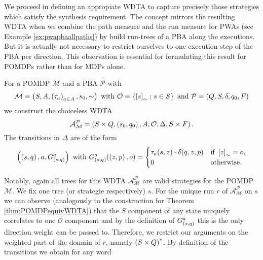 We proceed in defining an appropiate \ac{WDTA} to capture precisely those 
strategies which satisfy the synthesis requirement. The concept mirrors the
resulting \ac{WDTA} when we combine the path measure and the run measure for
\acp{PWA} (see Example \ref{ex:pwapbaallpaths}) by build run-trees of a 
\ac{PBA} along the executions. But it is actually not necessary to restrict
ourselves to one execution step of the \ac{PBA} per direction. This 
observation is essential for formulating this result for \acp{POMDP} rather 
than for \acp{MDP} alone.
\begin{definition}
  For a \ac{POMDP} $\mathcal{M}$ and a \ac{PBA} $\mathcal{P}$ with
  \begin{equation*}
    \mathcal{M} = \left(S, A, \left(\tau_{a}\right)_{a\in A}, s_{0}, \sim\right)
    \text{ with }
    \mathcal{O} = \left\{\left[s\right]_{\sim}: s\in S\right\}
    \text{ and }
    \mathcal{P} = \left(Q, S, \delta, q_{0}, F\right)
  \end{equation*} 
  we construct the choiceless \ac{WDTA}
  \begin{equation*}
    \mathcal{A}_{\mathcal{M}}^{\mathcal{P}} = \left(
      S\times Q, \left(s_{0}, q_{0}\right), A, \mathcal{O}, \Delta, S\times F
    \right).
  \end{equation*}
  The transitions in $\Delta$ are of the form
  \begin{equation*}
    \left(\left(s, q\right), a, G_{\left(s,q\right)}^{a}\right)
    \text{ with }
    G_{\left(s,q\right)}^{a}(\left(z,p\right), o) = \begin{cases}
      \tau_{a}(s, z)\cdot\delta(q, z, p)&\text{if }\left[z\right]_{\sim} = o,\\
      0&\text{otherwise}.
    \end{cases}
  \end{equation*}
\end{definition}
Notably, again all trees for this \ac{WDTA} 
$\mathcal{A}_{\mathcal{M}}^{\mathcal{P}}$ are valid strategies for the 
\ac{POMDP} $\mathcal{M}$. We fix one tree (or strategie respectively) $s$. 
For the unique run $r$ of $\mathcal{A}_{\mathcal{M}}^{\mathcal{P}}$ on $s$ we
can observe (analogously to the construction for Theorem 
\ref{thm:POMDPequivWDTA}) that the $S$ component of any state uniquely 
correlates to one $\mathcal{O}$ component and by the definition of 
$G_{\left(s, q\right)}^{a}$ this is the only direction weight can be passed to.
Therefore, we restrict our arguments on the weighted part of the domain of
$r$, namely $\left(S\times Q\right)^{*}$. By definition of the transitions we 
obtain for any word 
